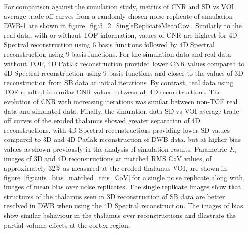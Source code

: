 For comparison against the simulation study, metrics of CNR and SD vs VOI average trade-off curves from a randomly chosen noise replicate of simulation DWB-1 are shown in figure~\ref{fig:3_2_SingleReplicateMeanCov}.
Similarly to the real data, with or without TOF information, values of CNR are highest for 4D Spectral reconstruction using 6 basis functions followed by 4D Spectral reconstruction using 9 basis functions.
For the simulation data and real data without TOF, 4D Patlak reconstruction provided lower CNR values compared to 4D Spectral reconstruction using 9 basis functions and closer to the values of 3D reconstruction from SB data at initial iterations. By contrast, real data using TOF resulted in similar CNR values between all 4D reconstructions.
The evolution of CNR with increasing iterations was similar between non-TOF real data and simulated data. 
Finally, the simulation data SD vs VOI average trade-off curves of the eroded thalamus showed greater separation of 4D reconstructions, with 4D Spectral reconstructions providing lower SD values compared to 3D and 4D Patlak reconstruction of DWB data, but at higher bias values as shown previously in the analysis of simulation results.
Parametric $K_i$ images of 3D and 4D reconstructions at matched RMS CoV values, of approximately 32\% as measured at the eroded thalamus VOI, are shown in figure~\ref{fig:cuts_bias_matched_rms_CoV} for a single noise replicate along with images of mean bias over noise replicates. The single replicate images show that structures of the thalamus seen in 3D reconstruction of SB data are better resolved in DWB when using the 4D Spectral reconstruction. The images of bias show similar behaviour in the thalamus over reconstructions and illustrate the partial volume effects at the cortex region.

